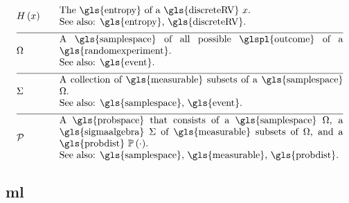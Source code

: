 \newpage
\begin{align} 
	&\entropy{x} &\quad & \parbox{.85\textwidth}{The \gls{entropy} of a \gls{discreteRV} $x$. 
		\\ See also: \gls{entropy}, \gls{discreteRV}.}  \nonumber \\[2mm] \hline \nonumber\\[-5mm]
	&\samplespace &\quad & \parbox{.85\textwidth}{A \gls{samplespace} of all possible \glspl{outcome} of a \gls{randomexperiment}. 
		\\ See also: \gls{event}.}  \nonumber \\[2mm] \hline \nonumber\\[-5mm]
	&\sigmaalgebra &\quad & \parbox{.85\textwidth}{A collection of \gls{measurable} subsets of a \gls{samplespace} $\samplespace$. 
		\\ See also: \gls{samplespace}, \gls{event}.}  \nonumber \\[2mm] \hline \nonumber\\[-5mm]
	&\mathcal{P} &\quad & \parbox{.85\textwidth}{A \gls{probspace} that consists of a \gls{samplespace} $\samplespace$, a 
		\gls{sigmaalgebra} $\sigmaalgebra$ of \gls{measurable} subsets of $\samplespace$, and a \gls{probdist} $\prob{ \cdot}$.
		\\ See also: \gls{samplespace}, \gls{measurable}, \gls{probdist}.} \nonumber                                       
\end{align}



\newpage
\subsection*{\Gls{ml}}

